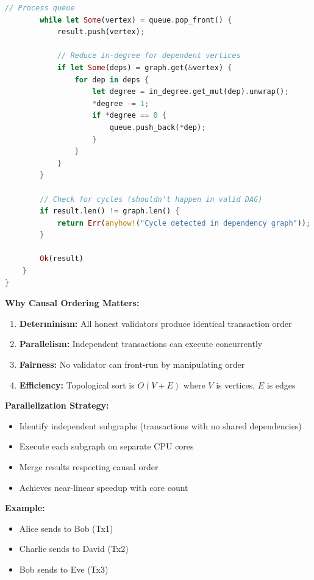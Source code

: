\documentclass[11pt,a4paper]{article}
\begin{document}
\begin{lstlisting}[language=Rust,caption={Causal Ordering Engine for DAG}]
        // Process queue
        while let Some(vertex) = queue.pop_front() {
            result.push(vertex);

            // Reduce in-degree for dependent vertices
            if let Some(deps) = graph.get(&vertex) {
                for dep in deps {
                    let degree = in_degree.get_mut(dep).unwrap();
                    *degree -= 1;
                    if *degree == 0 {
                        queue.push_back(*dep);
                    }
                }
            }
        }

        // Check for cycles (shouldn't happen in valid DAG)
        if result.len() != graph.len() {
            return Err(anyhow!("Cycle detected in dependency graph"));
        }

        Ok(result)
    }
}
\end{lstlisting}

\textbf{Why Causal Ordering Matters:}

\begin{enumerate}[leftmargin=*]
\item \textbf{Determinism:} All honest validators produce identical transaction order
\item \textbf{Parallelism:} Independent transactions can execute concurrently
\item \textbf{Fairness:} No validator can front-run by manipulating order
\item \textbf{Efficiency:} Topological sort is $O(V + E)$ where $V$ is vertices, $E$ is edges
\end{enumerate}

\textbf{Parallelization Strategy:}

\begin{itemize}[leftmargin=*]
\item Identify independent subgraphs (transactions with no shared dependencies)
\item Execute each subgraph on separate CPU cores
\item Merge results respecting causal order
\item Achieves near-linear speedup with core count
\end{itemize}

\textbf{Example:}
\begin{itemize}[leftmargin=*]
\item Alice sends to Bob (Tx1)
\item Charlie sends to David (Tx2)
\item Bob sends to Eve (Tx3)
\end{itemize}
\end{document}
